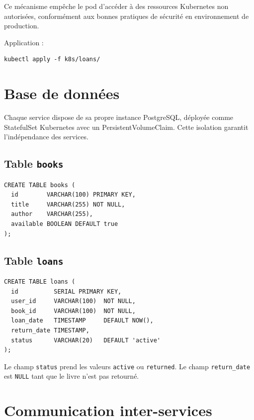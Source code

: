 \documentclass[12pt,a4paper]{article}
\begin{document}
Ce mécanisme empêche le pod d'accéder à des ressources Kubernetes non autorisées,
conformément aux bonnes pratiques de sécurité en environnement de production.

Application :

\begin{Verbatim}[breaklines=true,breakanywhere=true]
kubectl apply -f k8s/loans/
\end{Verbatim}

\section{Base de données}

Chaque service dispose de sa propre instance PostgreSQL, déployée comme StatefulSet Kubernetes
avec un PersistentVolumeClaim. Cette isolation garantit l'indépendance des services.

\subsection{Table \texttt{books}}

\begin{Verbatim}[breaklines=true,breakanywhere=true]
CREATE TABLE books (
  id        VARCHAR(100) PRIMARY KEY,
  title     VARCHAR(255) NOT NULL,
  author    VARCHAR(255),
  available BOOLEAN DEFAULT true
);
\end{Verbatim}

\subsection{Table \texttt{loans}}

\begin{Verbatim}[breaklines=true,breakanywhere=true]
CREATE TABLE loans (
  id          SERIAL PRIMARY KEY,
  user_id     VARCHAR(100)  NOT NULL,
  book_id     VARCHAR(100)  NOT NULL,
  loan_date   TIMESTAMP     DEFAULT NOW(),
  return_date TIMESTAMP,
  status      VARCHAR(20)   DEFAULT 'active'
);
\end{Verbatim}

Le champ \texttt{status} prend les valeurs \texttt{active} ou \texttt{returned}.
Le champ \texttt{return\_date} est \texttt{NULL} tant que le livre n'est pas retourné.

\section{Communication inter-services}
\end{document}
